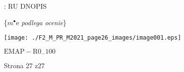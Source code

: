 \documentclass[a4paper,12pt]{article}
\begin{document}
: RU DNOPIS

\{$m^{\bullet}\mathrm{e}$ {\it podlega ocenie}\}
\begin{center}
\texttt{[image: ./F2\_M\_PR\_M2021\_page26\_images/image001.eps]}
\end{center}
$\mathrm{E}\mathrm{M}\mathrm{A}\mathrm{P}-\mathrm{R}0_{-}100$

Strona 27 z27
\end{document}
